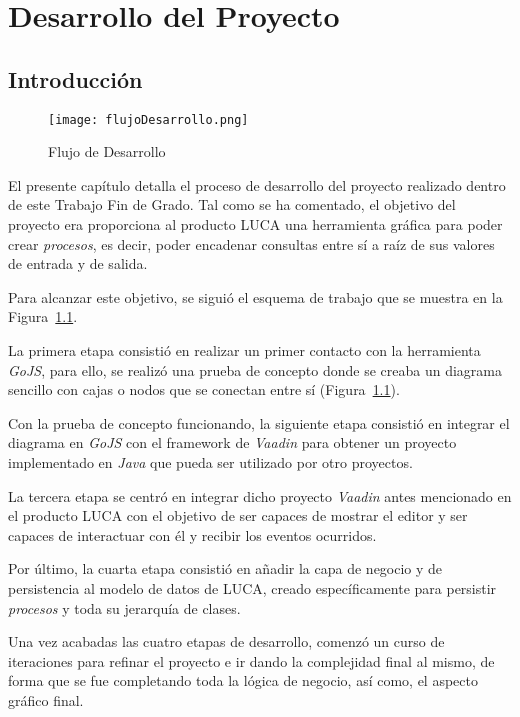 \chapter{Desarrollo del Proyecto}

\minitoc

\section{Introducción}

\begin{figure}[!tb]
	\centering
	\texttt{[image: flujoDesarrollo.png]}
	\caption{Flujo de Desarrollo}
	\label{fig:flujoDesarrollo}
\end{figure}


El presente capítulo detalla el proceso de desarrollo del proyecto realizado dentro de este Trabajo Fin de Grado. Tal como se ha comentado, el objetivo del proyecto era 
proporciona al producto LUCA una herramienta gráfica para poder crear \emph{procesos}, es decir, poder encadenar consultas entre sí a raíz de sus valores de entrada y de salida.

Para alcanzar este objetivo, se siguió el esquema de trabajo que se muestra en la Figura~\ref{fig:flujoDesarrollo}.  

La primera etapa consistió en realizar un primer contacto con la herramienta \emph{GoJS}, para ello, se realizó una prueba de concepto donde se creaba un diagrama sencillo con cajas o nodos que se conectan entre sí (Figura~\ref{}).

Con la prueba de concepto funcionando, la siguiente etapa consistió en integrar el diagrama en \emph{GoJS} con el framework de \emph{Vaadin} para obtener un proyecto implementado en \emph{Java} que pueda ser utilizado por otro proyectos.

La tercera etapa se centró en integrar dicho proyecto \emph{Vaadin} antes mencionado en el producto LUCA con el objetivo de ser capaces de mostrar el editor y ser capaces de interactuar con él y recibir los eventos ocurridos.

Por último, la cuarta etapa consistió en añadir la capa de negocio y de persistencia al modelo de datos de LUCA, creado específicamente para persistir \emph{procesos} y toda su jerarquía de clases.

Una vez acabadas las cuatro etapas de desarrollo, comenzó un curso de iteraciones para refinar el proyecto e ir dando la complejidad final al mismo, de forma que se fue completando toda la lógica de negocio, así como, el aspecto gráfico final.

